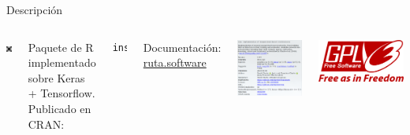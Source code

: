 \begin{frame}[fragile]{Descripción}

\begin{columns}[c]

\includegraphics[width=0.2\columnwidth]{imgs/ruta_logo64}

Paquete de R implementado sobre \alert{Keras + Tensorflow}. Publicado en CRAN:

\small
\begin{verbatim}
install.packages("ruta")
\end{verbatim}
\normalsize

Documentación: \href{https://ruta.software}{ruta.software}


\includegraphics[width=\columnwidth]{imgs/rutacran}

\flushright
\includegraphics[width=0.3\columnwidth,trim={0 7cm 0 0},clip]{imgs/gpl3}

\end{columns}

\end{frame}

